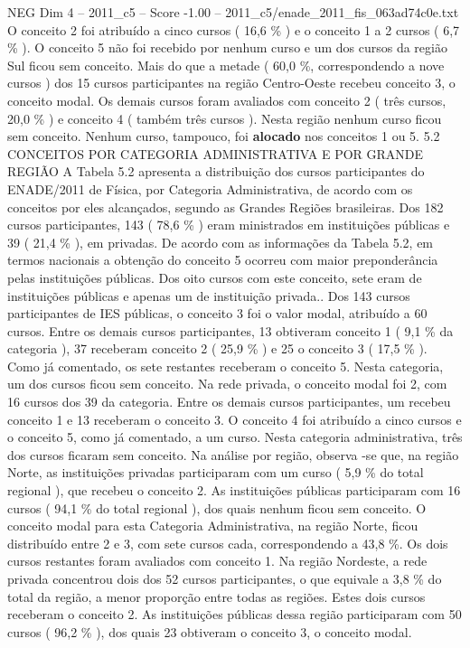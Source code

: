 \begin{textsample}{NEG Dim 4 – 2011\_c5 – Score -1.00 – 2011\_c5/enade\_2011\_fis\_063ad74c0e.txt}
O conceito 2 foi atribuído a cinco cursos ( 16,6 \% ) e o conceito 1 a 2 cursos ( 6,7 \% ).
O conceito 5 não foi recebido por nenhum curso e um dos cursos da região Sul ficou sem conceito.
Mais do que a metade ( 60,0 \%, correspondendo a nove cursos ) dos 15 cursos participantes na região Centro-Oeste recebeu conceito 3, o conceito modal.
Os demais cursos foram avaliados com conceito 2 ( três cursos, 20,0 \% ) e conceito 4 ( também três cursos ).
Nesta região nenhum curso ficou sem conceito.
Nenhum curso, tampouco, foi \textbf{alocado} nos conceitos 1 ou 5. 5.2 CONCEITOS POR CATEGORIA ADMINISTRATIVA E POR GRANDE REGIÃO A Tabela 5.2 apresenta a distribuição dos cursos participantes do ENADE/2011 de Física, por Categoria Administrativa, de acordo com os conceitos por eles alcançados, segundo as Grandes Regiões brasileiras.
Dos 182 cursos participantes, 143 ( 78,6 \% ) eram ministrados em instituições públicas e 39 ( 21,4 \% ), em privadas.
De acordo com as informações da Tabela 5.2, em termos nacionais a obtenção do conceito 5 ocorreu com maior preponderância pelas instituições públicas.
Dos oito cursos com este conceito, sete eram de instituições públicas e apenas um de instituição privada..
Dos 143 cursos participantes de IES públicas, o conceito 3 foi o valor modal, atribuído a 60 cursos.
Entre os demais cursos participantes, 13 obtiveram conceito 1 ( 9,1 \% da categoria ), 37 receberam conceito 2 ( 25,9 \% ) e 25 o conceito 3 ( 17,5 \% ).
Como já comentado, os sete restantes receberam o conceito 5.
Nesta categoria, um dos cursos ficou sem conceito.
Na rede privada, o conceito modal foi 2, com 16 cursos dos 39 da categoria.
Entre os demais cursos participantes, um recebeu conceito 1 e 13 receberam o conceito 3.
O conceito 4 foi atribuído a cinco cursos e o conceito 5, como já comentado, a um curso.
Nesta categoria administrativa, três dos cursos ficaram sem conceito.
Na análise por região, observa -se que, na região Norte, as instituições privadas participaram com um curso ( 5,9 \% do total regional ), que recebeu o conceito 2.
As instituições públicas participaram com 16 cursos ( 94,1 \% do total regional ), dos quais nenhum ficou sem conceito.
O conceito modal para esta Categoria Administrativa, na região Norte, ficou distribuído entre 2 e 3, com sete cursos cada, correspondendo a 43,8 \%.
Os dois cursos restantes foram avaliados com conceito 1.
Na região Nordeste, a rede privada concentrou dois dos 52 cursos participantes, o que equivale a 3,8 \% do total da região, a menor proporção entre todas as regiões.
Estes dois cursos receberam o conceito 2.
As instituições públicas dessa região participaram com 50 cursos ( 96,2 \% ), dos quais 23 obtiveram o conceito 3, o conceito modal.

\end{textsample}
